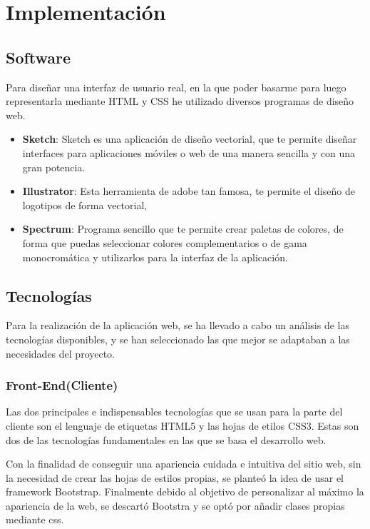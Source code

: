 \chapter{Implementación}

\section{Software}

Para diseñar una interfaz de usuario real, en la que poder basarme para luego representarla mediante HTML y CSS he utilizado diversos programas de diseño web.

\begin{itemize}

\item \textbf{Sketch}: Sketch es una aplicación de diseño vectorial, que te permite diseñar interfaces para aplicaciones móviles o web de una manera sencilla y con una gran potencia.
\item \textbf{Illustrator}: Esta herramienta de adobe tan famosa, te permite el diseño de logotipos de forma vectorial,
\item \textbf{Spectrum}: Programa sencillo que te permite crear paletas de colores, de forma que puedas seleccionar colores complementarios o de gama monocromática y utilizarlos para la interfaz de la aplicación.

\end{itemize}

\section{Tecnologías}

Para la realización de la aplicación web, se ha llevado a cabo un análisis de las tecnologías disponibles, y se han seleccionado las que mejor se adaptaban a las necesidades del proyecto.

\subsection{Front-End(Cliente)}

Las dos principales e indispensables tecnologías que se usan para la parte del cliente son el lenguaje de etiquetas HTML5 y las hojas de etilos CSS3. Estas son dos de las tecnologías fundamentales en las que se basa el desarrollo web.

 \vspace{5 mm}

 Con la finalidad de conseguir una apariencia cuidada e intuitiva del sitio web, sin la necesidad de crear las hojas de estilos propias, se planteó la idea de usar el framework Bootstrap. Finalmente debido al objetivo de personalizar al máximo la apariencia de la web, se descartó Bootstra y se optó por añadir clases propias mediante css.

